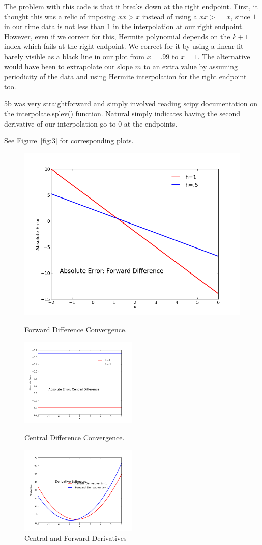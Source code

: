 \documentclass[11pt,letterpaper]{article}
\begin{document}
The problem with this code is that it breaks down at the right endpoint. First, it thought this was a relic of imposing $xx >x$ instead of using a $xx >= x$, since $1$ in our time data is not less than $1$ in the interpolation at our right endpoint. However, even if we correct for this, Hermite polynomial depends on the $k+1$ index which fails at the right endpoint. We correct for it by using a linear fit barely visible as a black line in our plot from $x=.99$ to $x=1$. The alternative would have been to extrapolate our slope $m$ to an extra value by assuming periodicity of the data and using Hermite interpolation for the right endpoint too.

5b was very straightforward and simply involved reading scipy documentation on the interpolate.splev() function. Natural simply indicates having the second derivative of our interpolation go to $0$ at the endpoints.

See Figure~\ref{fig:3} for corresponding plots.

\begin{figure}[bth]
\centering
\includegraphics[width=.5\textwidth]{ws22f.png}
\caption{Forward Difference Convergence.}
\label{fig:1}
\includegraphics[width=0.5\textwidth]{ws22c.png}
\caption{Central Difference Convergence.}
\label{fig:1}
\includegraphics[width=0.5\textwidth]{ws22d.png}
\caption{Central and Forward Derivatives}

\end{figure}
\end{document}
